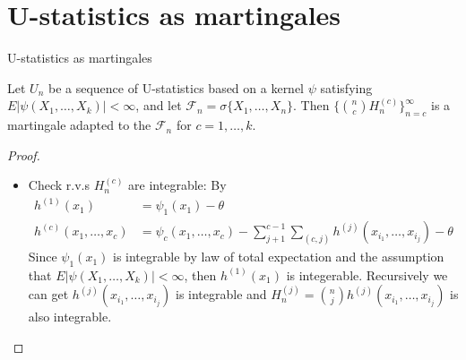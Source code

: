 \documentclass{beamer}
\theoremstyle{definition}
\numberwithin{Def}{section}
\begin{document}
\section{U-statistics as martingales}
\begin{frame}{U-statistics as martingales}
\begin{theorem}\label{mat}
Let $U_n$ be a sequence of U-statistics based on a kernel $\psi$ satisfying $E|\psi(X_1, \dotsc, X_k)|<\infty$, and let $\mathcal{F}_n=\sigma\{X_1, \dotsc, X_n\}$. Then $\{{n \choose c} H_n^{(c)}\}_{n=c}^\infty$ is a martingale adapted to the $\mathcal{F}_n$ for $c=1,\dotsc, k$.
\end{theorem}
\begin{fontsize}{9}{12}
\begin{proof}
\begin{itemize}
    \item Check r.v.s $H_n^{(c)}$ are integrable: By
\begin{align*}
h^{(1)}(x_1)&=\psi_1(x_1)-\theta\\
h^{(c)}(x_1,\dotsc,x_c)&=\psi_c(x_1,\dotsc,x_c)-\sum_{j+1}^{c-1}\sum_{(c,j)}h^{(j)}(x_{i_1},\dotsc,x_{i_j})-\theta
\end{align*}
Since $\psi_1(x_1)$ is integrable by law of total expectation and the assumption that $E|\psi(X_1, \dotsc, X_k)|<\infty$, then $h^{(1)}(x_1)$ is integerable. Recursively we can get $h^{(j)}(x_{i_1},\dotsc,x_{i_j})$ is integrable and $H_n^{(j)}={n\choose j}h^{(j)}(x_{i_1},\dotsc,x_{i_j})$ is also integrable.
\end{itemize}
\end{proof}
\end{fontsize}
\end{frame}
\end{document}
